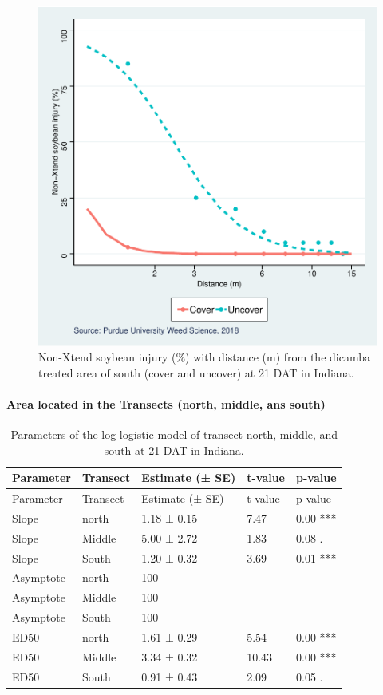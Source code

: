\documentclass[]{article}
\let\oldparagraph\paragraph
\renewcommand{\paragraph}[1]{\oldparagraph{#1}\mbox{}}
\begin{document}
\begin{figure}
\centering
\includegraphics{Report_files/figure-latex/IN21S2Plot-1.pdf}
\caption{Non-Xtend soybean injury (\%) with distance (m) from the
dicamba treated area of south (cover and uncover) at 21 DAT in Indiana.}
\end{figure}

\newpage

\paragraph{\texorpdfstring{Area located in the \textbf{Transects}
(north, middle, ans
south)}{Area located in the Transects (north, middle, ans south)}}\label{area-located-in-the-transects-north-middle-ans-south}

\begin{longtable}[]{@{}lllll@{}}
\caption{Parameters of the log-logistic model of transect north, middle,
and south at 21 DAT in Indiana.}\tabularnewline
\toprule
Parameter & Transect & Estimate (± SE) & t-value &
p-value\tabularnewline
\midrule
\endfirsthead
\toprule
Parameter & Transect & Estimate (± SE) & t-value &
p-value\tabularnewline
\midrule
\endhead
Slope & north & 1.18 ± 0.15 & 7.47 & 0.00 ***\tabularnewline
Slope & Middle & 5.00 ± 2.72 & 1.83 & 0.08 .\tabularnewline
Slope & South & 1.20 ± 0.32 & 3.69 & 0.01 ***\tabularnewline
Asymptote & north & 100 & &\tabularnewline
Asymptote & Middle & 100 & &\tabularnewline
Asymptote & South & 100 & &\tabularnewline
ED50 & north & 1.61 ± 0.29 & 5.54 & 0.00 ***\tabularnewline
ED50 & Middle & 3.34 ± 0.32 & 10.43 & 0.00 ***\tabularnewline
ED50 & South & 0.91 ± 0.43 & 2.09 & 0.05 .\tabularnewline
\bottomrule
\end{longtable}
\end{document}
